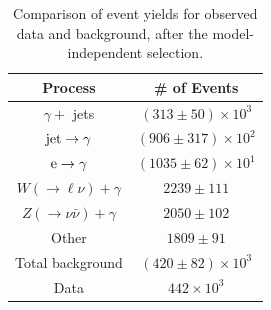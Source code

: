\begin{table}[H]                                                                  
\center    
{          
\begin{tabular}{|c|c|}                                                             
\hline     
Process & \# of Events \\                                                              
\hline     
$\gamma +$ jets                          & $(313 \pm 50 ) \times 10^3$ \\
${\rm jet}\rightarrow \gamma$        & $(906 \pm 317 ) \times 10^2$ \\
${\rm e} \rightarrow \gamma$         & $(1035 \pm 62 ) \times 10^1$ \\
$W(\to \ell\nu)+\gamma $                 &  $2239 \pm 111$ \\
$Z( \to \nu \bar{\nu} )+\gamma    $      &  $2050 \pm 102$ \\
Other                                    &  $1809 \pm 91$ \\
\hline
Total background                       &   $(420 \pm 82 ) \times 10^3$ \\
\hline
Data                                   &  $442 \times 10^3$  \\
\hline     
\end{tabular}  
\caption{Comparison of event yields for observed data and background, after the model-independent selection.}
\label{table:modelInd}
}          
\end{table}

